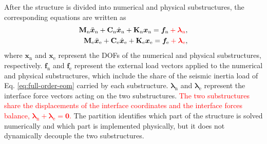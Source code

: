 \documentclass[11pt,a4paper]{article}
\numberwithin{equation}{section}
\newcommand{\rev}[1]{\textcolor{red}{#1}}
\begin{document}
After the structure is divided into numerical and physical substructures, the corresponding equations are written as
\begin{subequations}
	\label{eq:substructure-eom}
	\begin{align}
		\mathbf{M}_{\mathrm{n}}\ddot{\bm{x}}_{\mathrm{n}}
		+\mathbf{C}_{\mathrm{n}}\dot{\bm{x}}_{\mathrm{n}}
		+\mathbf{K}_{\mathrm{n}}\bm{x}_{\mathrm{n}}
		=\bm{f}_{\mathrm{n}}\rev{{}+\bm{\lambda}_{\mathrm{n}}},
		\label{eq:numerical-eom}\\
		\mathbf{M}_{\mathrm{e}}\ddot{\bm{x}}_{\mathrm{e}}
		+\mathbf{C}_{\mathrm{e}}\dot{\bm{x}}_{\mathrm{e}}
		+\mathbf{K}_{\mathrm{e}}\bm{x}_{\mathrm{e}}
		=\bm{f}_{\mathrm{e}}\rev{{}+\bm{\lambda}_{\mathrm{e}}},
		\label{eq:physical-eom}
	\end{align}
\end{subequations}
where \(\bm{x}_{\mathrm{n}}\) and \(\bm{x}_{\mathrm{e}}\) represent the DOFs of the numerical and physical substructures, respectively. \(\bm{f}_{\mathrm{n}}\) and \(\bm{f}_{\mathrm{e}}\) represent the external load vectors applied to the numerical and physical substructures, which include the share of the seismic inertia load of Eq. \eqref{eq:full-order-eom} carried by each substructure. \(\bm{\lambda}_{\mathrm{n}}\) and \(\bm{\lambda}_{\mathrm{e}}\) represent the interface force vectors acting on the two substructures. \rev{The two substructures share the displacements of the interface coordinates and the interface forces balance, \(\bm{\lambda}_{\mathrm{n}}+\bm{\lambda}_{\mathrm{e}}=\bm{0}\).} The partition identifies which part of the structure is solved numerically and which part is implemented physically, but it does not dynamically decouple the two substructures.
\end{document}
